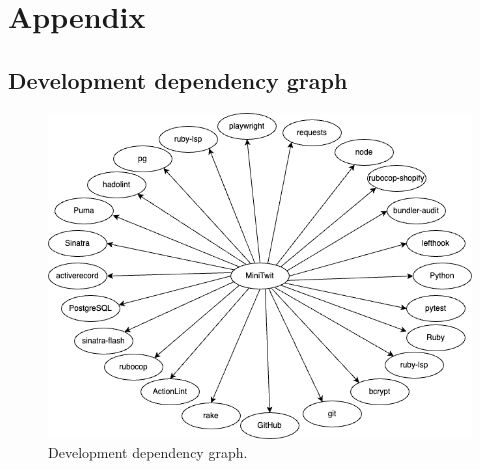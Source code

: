 \documentclass{article}
\begin{document}








\newpage
\appendix
\section{Appendix}

\subsection{Development dependency graph} \label{appendix: dev-dependecies}
\begin{figure}[H]
    \centering
    \includegraphics[width=\textwidth]{images/dependency-graph-dev.png}
    \caption{Development dependency graph.}
    \label{fig:dep-dev}
\end{figure}
\end{document}
